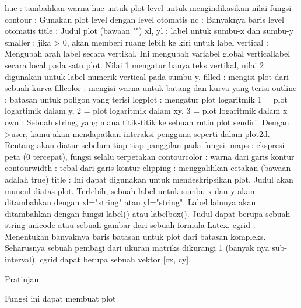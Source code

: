 \documentclass[a4paper,10pt]{article}
\begin{document}
\begin{eulernotebook}
\begin{eulercomment}
\begin{eulercomment}
\begin{eulercomment}
\begin{eulercomment}
\begin{eulercomment}
\end{eulercomment}
\begin{eulerttcomment}
 hue       : tambahkan warna hue untuk plot level untuk
             mengindikasikan nilai fungsi
 contour   : Gunakan plot level dengan level otomatis
 nc        : Banyaknya baris level otomatis
 title     : Judul plot (bawaan "")
 xl, yl    : label untuk sumbu-x dan sumbu-y
 smaller   : jika > 0, akan memberi ruang lebih ke kiri untuk label
 vertical  :
   Mengubah arah label secara vertikal. Ini mengubah variabel global
   verticallabel secara local pada satu plot. Nilai 1 mengatur hanya
   teks vertikal, nilai 2 digunakan untuk label numerik vertical pada
   sumbu y.
 filled    : mengisi plot dari sebuah kurva
 fillcolor : mengisi warna untuk batang dan kurva yang terisi
 outline   : batasan untuk poligon yang terisi
 logplot   : mengatur plot logaritmik
             1 = plot logartimik dalam y,
             2 = plot logaritmik dalam xy,
             3 = plot logaritmik dalam x
 own       :
   Sebuah string, yang mana titik-titik ke sebuah rutin plot sendiri.
   Dengan >user, kamu akan mendapatkan interaksi pengguna seperti
   dalam plot2d. Rentang akan diatur sebelum tiap-tiap panggilan
   pada fungsi.
 maps      : ekspresi peta (0 tercepat), fungsi selalu terpetakan
 contourcolor : warna dari garis kontur
 contourwidth : tebal dari garis kontur
 clipping  : menggalihkan cetakan (bawaan adalah true)
 title     :
   Ini dapat digunakan untuk mendeskripsikan plot. Judul akan muncul
   diatas plot. Terlebih, sebuah label untuk sumbu x dan y akan
   ditambahkan dengan xl="string" atau yl="string". Label lainnya akan
   ditambahkan dengan fungsi label() atau labelbox(). Judul dapat
   berupa sebuah string unicode atau sebuah gambar dari sebuah formula
   Latex.
 cgrid     :
   Menentukan banyaknya baris batasan untuk plot dari batasan
   kompleks. Seharusnya sebuah pembagi dari ukuran matriks
   dikurangi 1 (banyak nya sub-interval). cgrid dapat berupa
   sebuah vektor [cx, cy].
\end{eulerttcomment}
\begin{eulercomment}

\end{eulercomment}
\begin{eulerttcomment}
 Pratinjau
\end{eulerttcomment}
\begin{eulercomment}

\end{eulercomment}
\begin{eulerttcomment}
 Fungsi ini dapat membuat plot
\end{eulerttcomment}
\begin{eulercomment}


\end{eulercomment}
\end{eulercomment}
\end{eulercomment}
\end{eulercomment}
\end{eulercomment}
\end{eulernotebook}
\end{document}
